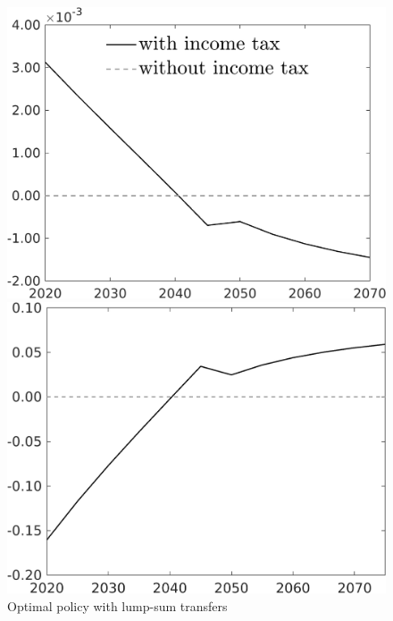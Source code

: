 \begin{figure}[h!!!]
	\centering
	\caption{Optimal policy with lump-sum transfers}\label{fig:opt_TLs}
	\begin{minipage}[]{0.32\textwidth}
		\includegraphics[width=1\textwidth]{../../codding_model/own_basedOnFried/optimalPol_010922_revision/figures/all_13Sept22_Tplus30/taul_OPT_COMPtaul_regime4_spillover0_knspil0_noskill0_sep0_xgrowth0_PV1_etaa0.79_lgd1.png}
	\end{minipage}
	\begin{minipage}[]{0.32\textwidth}
		\includegraphics[width=1\textwidth]{../../codding_model/own_basedOnFried/optimalPol_010922_revision/figures/all_13Sept22_Tplus30/Tauf_OPT_COMPtaulPer_regime4_spillover0_knspil0_noskill0_sep0_xgrowth0_PV1_etaa0.79.png}

\end{minipage}
\end{figure}
